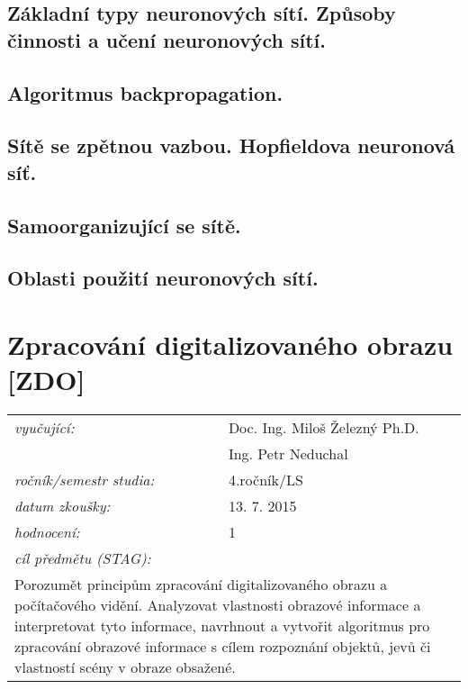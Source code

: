 \subsection{Základní typy neuronových sítí. Způsoby činnosti a učení neuronových sítí.}

\subsection{Algoritmus backpropagation.}

\subsection{Sítě se zpětnou vazbou. Hopfieldova neuronová síť.}

\subsection{Samoorganizující se sítě.}

\subsection{Oblasti použití neuronových sítí.}

\section{Zpracování digitalizovaného obrazu [ZDO]}

\begin{table}[H]
\centering
\begin{tabular}{p{4cm} p{12cm}}
\textit{vyučující:}             & Doc. Ing. Miloš Železný Ph.D. \\
								 & Ing. Petr Neduchal \\
\textit{ročník/semestr studia:} & 4.ročník/LS \\
\textit{datum zkoušky:}         & 13. 7. 2015 \\
\textit{hodnocení:}             & 1 \\
\textit{cíl předmětu (STAG):}   & \\
\multicolumn{2}{p{16cm}}{Porozumět principům zpracování digitalizovaného obrazu a počítačového vidění. Analyzovat vlastnosti obrazové informace a interpretovat tyto informace, navrhnout a vytvořit algoritmus pro zpracování obrazové informace s cílem rozpoznání objektů, jevů či vlastností scény v obraze obsažené.}
\end{tabular}
\end{table}

